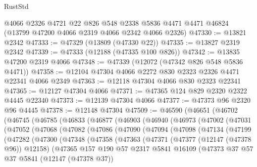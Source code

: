 \begin{lexlean}{RustStd}
\begin{coremodule}
    @4066
    @2326
    @4721
    @22
    @826
    @548
    @2338
    @5836
    @4471
    @4471
    @46824
    (@13799 @47200 @4066 @2319 @4066 @2342 @4066 @2326)
@47330 := @13821 @2342
@47333 := @47329 (@13809 (@47330 @22))
@47335 := @13827 @2319 @2342
@47339 := @47333 (@12188 (@47335 @100 @826))
@47342 := @13835 @47200 @2319 @4066
@47348 := @47339 (@12072 (@47342 @826 @548 @5836 @4471))
@47358 := @12104 @47304 @4066 @2272 @830 @2323 @2326 @4471 @22341 @4066 @2349
@47363 := @12118 @47304 @4066 @830 @2323 @22341
@47365 := @12127 @47304 @4066
@47371 := @47365 @124 @829 @2320 @2322 @4445 @22340
@47373 := @12139 @47304 @4066
@47377 := @47373 @96 @2320 @96 @4445
@47378 := @12148 @47304
@47509 := @46590
    (@46651
      (@46702
        (@46745
          (@46785
            (@46833
              (@46877
                (@46903
                  (@46940
                    (@46973
                      (@47002
                        (@47031
                          (@47052
                            (@47068
                              (@47082
                                (@47086
                                  (@47090
                                    (@47094
                                      (@47098
                                        (@47134
                                          (@47199
                                            (@47282
                                              (@47300
                                                (@47348
                                                  (@47358
                                                    (@47363
                                                      (@47371
                                                        (@47377 (@12147 (@47378 @96)) @12158)
                                                        (@47365
                                                          @157
                                                          @190
                                                          @57
                                                          @2317
                                                          @5841
                                                          @16109
                                                          (@47373
                                                            @37
                                                            @57
                                                            @37
                                                            @5841
                                                            (@12147 (@47378 @37))

\end{coremodule}
\end{lexlean}
